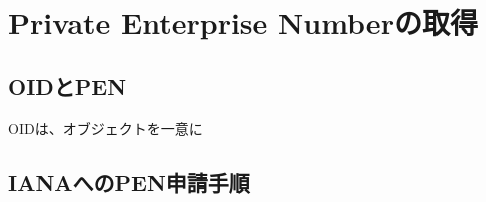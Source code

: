 \chapter{Private Enterprise Numberの取得}

\section{OIDとPEN}

OIDは、オブジェクトを一意に

\section*{IANAへのPEN申請手順}